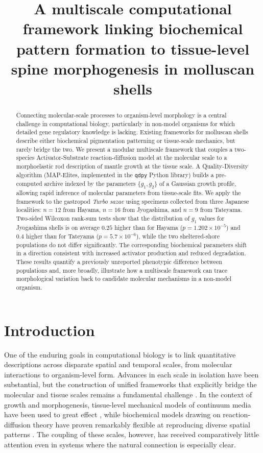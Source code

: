 \documentclass[11pt]{article}
\title{A multiscale computational framework linking biochemical pattern
formation to tissue-level spine morphogenesis in molluscan shells}
\author{}
\date{}
\begin{document}
\maketitle

\begin{abstract}
Connecting molecular-scale processes to organism-level morphology is a
central challenge in computational biology, particularly in non-model
organisms for which detailed gene regulatory knowledge is lacking. Existing
frameworks for molluscan shells describe either biochemical pigmentation
patterning or tissue-scale mechanics, but rarely bridge the two. We present
a modular multiscale framework that couples a two-species Activator-Substrate
reaction-diffusion model at the molecular scale to a morphoelastic rod
description of mantle growth at the tissue scale. A Quality-Diversity
algorithm (MAP-Elites, implemented in the \texttt{qdpy} Python library)
builds a pre-computed archive indexed by the parameters $\{g_1, g_2\}$ of a
Gaussian growth profile, allowing rapid inference of molecular parameters
from tissue-scale fits. We apply the framework to the gastropod
\textit{Turbo sazae} using specimens collected from three Japanese
localities: $n=12$ from Hayama, $n=16$ from Jyogashima, and $n=9$ from
Tateyama. Two-sided Wilcoxon rank-sum tests show that the distribution of
$g_1$ values for Jyogashima shells is on average $0.25$ higher than for
Hayama ($p = 1.202 \times 10^{-5}$) and $0.4$ higher than for Tateyama
($p = 5.7 \times 10^{-6}$), while the two sheltered-shore populations do not
differ significantly. The corresponding biochemical parameters shift in a
direction consistent with increased activator production and reduced
degradation. These results quantify a previously unreported phenotypic
difference between populations and, more broadly, illustrate how a
multiscale framework can trace morphological variation back to candidate
molecular mechanisms in a non-model organism.
\end{abstract}

\section{Introduction}

One of the enduring goals in computational biology is to link quantitative
descriptions across disparate spatial and temporal scales, from molecular
interactions to organism-level form. Advances in each scale in isolation
have been substantial, but the construction of unified frameworks that
explicitly bridge the molecular and tissue scales remains a fundamental
challenge \citep{goriely2017mathematics}. In the context of growth and
morphogenesis, tissue-level mechanical models of continuum media have been
used to great effect \citep{moulton2013morphoelastic,moulton2020morphoelastic},
while biochemical models drawing on reaction-diffusion theory have proven
remarkably flexible at reproducing diverse spatial patterns
\citep{turing1952chemical,gierer1972theory,meinhardt1987model,pueyo2018reactiondiffusion}.
The coupling of these scales, however, has received comparatively little
attention even in systems where the natural connection is especially clear.
\end{document}
